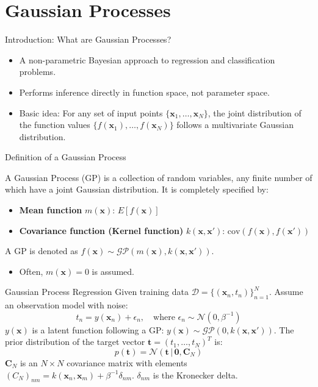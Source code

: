 \documentclass{beamer} %
\newcommand{\mat}[1]{\mathbf{#1}}
\newcommand{\vect}[1]{\mathbf{#1}}
\newcommand{\given}{\,|\,}
\begin{document}
\section{Gaussian Processes}
\begin{frame}{Introduction: What are Gaussian Processes?}
  \begin{itemize}
    \item A non-parametric Bayesian approach to regression and classification problems.
    \item Performs inference directly in function space, not parameter space.
    \item Basic idea: For any set of input points $\{ \vect{x}_1, \dots, \vect{x}_N \}$, the joint distribution of the function values $\{ f(\vect{x}_1), \dots, f(\vect{x}_N) \}$ follows a multivariate Gaussian distribution.
  \end{itemize}
\end{frame}

\begin{frame}{Definition of a Gaussian Process}
  \begin{dfn}
  A Gaussian Process (GP) is a collection of random variables, any finite number of which have a joint Gaussian distribution. It is completely specified by:
  \begin{itemize}
    \item \textbf{Mean function} $m(\vect{x})$: $E[f(\vect{x})]$
    \item \textbf{Covariance function (Kernel function)} $k(\vect{x}, \vect{x}')$: $\text{cov}(f(\vect{x}), f(\vect{x}'))$
  \end{itemize}
  A GP is denoted as $f(\vect{x}) \sim \mathcal{GP}(m(\vect{x}), k(\vect{x}, \vect{x}'))$.
  \end{dfn}
  \begin{itemize}
    \item Often, $m(\vect{x}) = 0$ is assumed.
  \end{itemize}
\end{frame}

\begin{frame}{Gaussian Process Regression}
  Given training data $\mathcal{D} = \{(\vect{x}_n, t_n)\}_{n=1}^N$.
  Assume an observation model with noise:
  \begin{equation*}
    t_n = y(\vect{x}_n) + \epsilon_n, \quad \text{where } \epsilon_n \sim \mathcal{N}(0, \beta^{-1})
  \end{equation*}
  $y(\vect{x})$ is a latent function following a GP: $y(\vect{x}) \sim \mathcal{GP}(0, k(\vect{x}, \vect{x}'))$.
  \vspace{0.5em}
  The prior distribution of the target vector $\vect{t} = (t_1, \dots, t_N)^T$ is:
  \begin{equation*}
    p(\vect{t}) = \mathcal{N}(\vect{t} \given \mathbf{0}, \mat{C}_N)
  \end{equation*}
  $\mat{C}_N$ is an $N \times N$ covariance matrix with elements $(C_N)_{nm} = k(\vect{x}_n, \vect{x}_m) + \beta^{-1} \delta_{nm}$.
  $\delta_{nm}$ is the Kronecker delta.
\end{frame}
\end{document}
